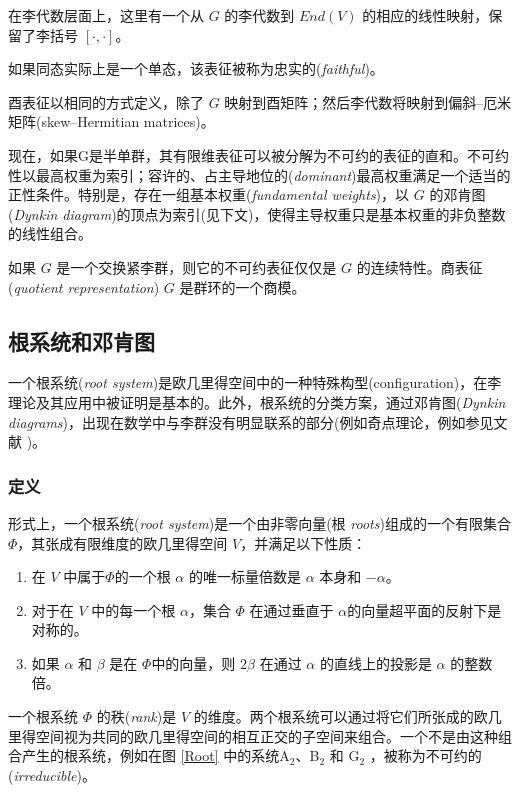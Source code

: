 \documentclass[11pt,fontset=founder]{ctexart}
\begin{document}
在李代数层面上，这里有一个从 $G$ 的李代数到 $End(V)$ 的相应的线性映射，保留了李括号 $[\cdot,\cdot]$。

如果同态实际上是一个单态，该表征被称为忠实的(\emph{faithful})。

酉表征以相同的方式定义，除了 $G$ 映射到酉矩阵；然后李代数将映射到偏斜–厄米矩阵(skew--Hermitian matrices)。

现在，如果G是半单群，其有限维表征可以被分解为不可约的表征的直和。不可约性以最高权重为索引；容许的、占主导地位的(\emph{dominant})最高权重满足一个适当的正性条件。特别是，存在一组基本权重(\emph{fundamental weights})，以 $G$ 的邓肯图(\textit{Dynkin diagram})的顶点为索引(见下文)，使得主导权重只是基本权重的非负整数的线性组合。

如果 $G$ 是一个交换紧李群，则它的不可约表征仅仅是 $G$ 的连续特性。商表征(\textit{quotient representation}) $G$ 是群环的一个商模。

\subsection{根系统和邓肯图}

一个根系统(\textit{root system})是欧几里得空间中的一种特殊构型(configuration)，在李理论及其应用中被证明是基本的。此外，根系统的分类方案，通过邓肯图(\emph{Dynkin diagrams})，出现在数学中与李群没有明显联系的部分(例如奇点理论，例如参见文献 \cite{Helgason})。

\subsubsection{定义}

形式上，一个根系统(\emph{root system})是一个由非零向量(根 \emph{roots})组成的一个有限集合 $\Phi $，其张成有限维度的欧几里得空间 $V$，并满足以下性质：

\begin{enumerate}
\item 在 $V$ 中属于$ \Phi $的一个根 $\alpha $ 的唯一标量倍数是 $\alpha $ 本身和 $-\alpha $。

\item 对于在 $V$ 中的每一个根 $\alpha $，集合 $\Phi $ 在通过垂直于 $\alpha $的向量超平面的反射下是对称的。

\item 如果 $\alpha $ 和 $\beta $ 是在 $\Phi $中的向量，则 $ 2\beta $ 在通过 $\alpha $ 的直线上的投影是 $\alpha $ 的整数倍。
\end{enumerate}

一个根系统 $\Phi $ 的秩(\emph{rank})是 $V$ 的维度。两个根系统可以通过将它们所张成的欧几里得空间视为共同的欧几里得空间的相互正交的子空间来组合。一个不是由这种组合产生的根系统，例如在图 \ref{Root} 中的系统A$_{\mathrm{2}}$、B$_{\mathrm{2}}$ 和 G$_{\mathrm{2}}$ ，被称为不可约的(\emph{irreducible})。
\end{document}
